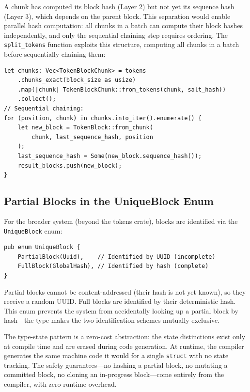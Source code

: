 A chunk has computed its block hash (Layer 2) but not yet its sequence hash (Layer 3), which depends on the parent block. This separation would enable parallel hash computation: all chunks in a batch can compute their block hashes independently, and only the sequential chaining step requires ordering. The \texttt{split\_tokens} function exploits this structure, computing all chunks in a batch before sequentially chaining them:

\begin{verbatim}
let chunks: Vec<TokenBlockChunk> = tokens
    .chunks_exact(block_size as usize)
    .map(|chunk| TokenBlockChunk::from_tokens(chunk, salt_hash))
    .collect();
// Sequential chaining:
for (position, chunk) in chunks.into_iter().enumerate() {
    let new_block = TokenBlock::from_chunk(
        chunk, last_sequence_hash, position
    );
    last_sequence_hash = Some(new_block.sequence_hash());
    result_blocks.push(new_block);
}
\end{verbatim}

\subsection{Partial Blocks in the UniqueBlock Enum}

For the broader system (beyond the tokens crate), blocks are identified via the \texttt{UniqueBlock} enum:

\begin{verbatim}
pub enum UniqueBlock {
    PartialBlock(Uuid),    // Identified by UUID (incomplete)
    FullBlock(GlobalHash), // Identified by hash (complete)
}
\end{verbatim}

Partial blocks cannot be content-addressed (their hash is not yet known), so they receive a random UUID. Full blocks are identified by their deterministic hash. This enum prevents the system from accidentally looking up a partial block by hash---the type makes the two identification schemes mutually exclusive.

\begin{insightbox}
The type-state pattern is a zero-cost abstraction: the state distinctions exist only at compile time and are erased during code generation. At runtime, the compiler generates the same machine code it would for a single \texttt{struct} with no state tracking. The safety guarantees---no hashing a partial block, no mutating a committed block, no cloning an in-progress block---come entirely from the compiler, with zero runtime overhead.
\end{insightbox}


